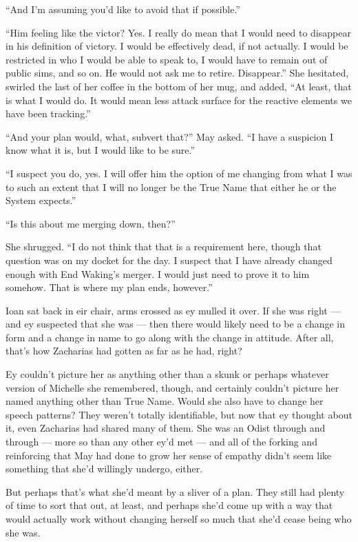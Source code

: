 ``And I'm assuming you'd like to avoid that if possible.''

``Him feeling like the victor? Yes. I really do mean that I would need to disappear in his definition of victory. I would be effectively dead, if not actually. I would be restricted in who I would be able to speak to, I would have to remain out of public sims, and so on. He would not ask me to retire. Disappear.'' She hesitated, swirled the last of her coffee in the bottom of her mug, and added, ``At least, that is what I would do. It would mean less attack surface for the reactive elements we have been tracking.''

``And your plan would, what, subvert that?'' May asked. ``I have a suspicion I know what it is, but I would like to be sure.''

``I suspect you do, yes. I will offer him the option of me changing from what I was to such an extent that I will no longer be the True Name that either he or the System expects.''

``Is this about me merging down, then?''

She shrugged. ``I do not think that that is a requirement here, though that question was on my docket for the day. I suspect that I have already changed enough with End Waking's merger. I would just need to prove it to him somehow. That is where my plan ends, however.''

Ioan sat back in eir chair, arms crossed as ey mulled it over. If she was right — and ey suspected that she was — then there would likely need to be a change in form and a change in name to go along with the change in attitude. After all, that's how Zacharias had gotten as far as he had, right?

Ey couldn't picture her as anything other than a skunk or perhaps whatever version of Michelle she remembered, though, and certainly couldn't picture her named anything other than True Name. Would she also have to change her speech patterns? They weren't totally identifiable, but now that ey thought about it, even Zacharias had shared many of them. She was an Odist through and through — more so than any other ey'd met — and all of the forking and reinforcing that May had done to grow her sense of empathy didn't seem like something that she'd willingly undergo, either.

But perhaps that's what she'd meant by a sliver of a plan. They still had plenty of time to sort that out, at least, and perhaps she'd come up with a way that would actually work without changing herself so much that she'd cease being who she was.

